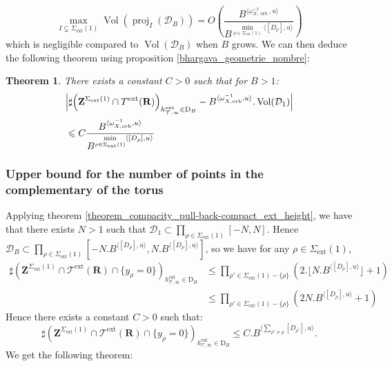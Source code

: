 \documentclass{proc-l}
\newcommand{\R}{\mathbf{R}}
\newcommand{\Z}{\mathbf{Z}}
\DeclareMathOperator{\proj}{proj}
\DeclareMathOperator{\Vol}{Vol}
\DeclareMathOperator{\orb}{orb}
\DeclareMathOperator{\ext}{ext}
\newcommand{\stackT}{\mathcal{T}}
\newcommand{\w}{\omega}
\newtheorem{theorem}{Theorem}[section]
\theoremstyle{definition}
\theoremstyle{remark}
\numberwithin{equation}{section}
\begin{document}
$$\max\limits_{ I \subsetneq \Sigma_{\ext}(1) } \Vol(\proj_I(\mathcal{D}_B)) = O\left( \frac{B^{\langle \w_{X,\orb}^{-1},u\rangle}}{B^{\min\limits_{\rho \in \Sigma_{\ext}(1)} \langle [D_{\rho}],u\rangle} } \right)$$which is negligible compared to $\Vol(\mathcal{D}_B)$ when $B$ grows. We can then deduce the following theorem using proposition \ref{bhargava_geometrie_nombre}:


\begin{theorem}\label{estimation_lattice}
    There exists a constant $C > 0$ such that for $B > 1$:
    \begin{align*}
        &\Big| \sharp \Bigl(  \Z^{\Sigma_{\ext}(1)} \cap T^{\ext}(\R) \Bigr)_{h^{\ext}_{\stackT,\infty} \in \mathrm{D}_{B}}  -   B^{ \langle \w_{X,\orb}^{-1} , u \rangle } . \Vol(\mathcal{D}_1) \Big| \\
        &\leqslant C \frac{B^{\langle \w_{X,\orb}^{-1},u\rangle}}{B^{\min\limits_{\rho \in \Sigma_{\ext}(1)} \langle [D_{\rho}],u\rangle} }
    \end{align*}
\end{theorem}

\subsubsection{Upper bound for the number of points in the complementary of the torus}

Applying theorem \ref{theorem_compacity_pull-back-compact_ext_height}, we have that there exists $N > 1$ such that $\mathcal{D}_1 \subset \prod\limits_{\rho \in \Sigma_{\ext}(1)} [-N,N]$. Hence $\mathcal{D}_B \subset  \prod\limits_{\rho \in \Sigma_{\ext}(1)} \left[ -N.B^{\langle [D_{\rho}] , u \rangle},N.B^{\langle [D_{\rho}] , u \rangle} \right] $, so we have for any $\rho \in \Sigma_{\ext}(1)$,
\begin{align*}
    \sharp\left(\Z^{\Sigma_{\ext}(1)} \cap \stackT^{\ext}(\R) \cap \{y_{\rho} = 0 \} \right)_{h^{\ext}_{\stackT,\infty} \in \mathrm{D}_B} &\leqslant \prod\limits_{\rho' \in \Sigma_{\ext}(1)-\{\rho\}} \left( 2.\lfloor N.B^{\langle [D_{\rho}] , u \rangle} \rfloor + 1 \right) \\
    &\leqslant \prod\limits_{\rho' \in \Sigma_{\ext}(1)-\{\rho\}} \left( 2 N.B^{\langle [D_{\rho}] , u \rangle} + 1 \right)
\end{align*}Hence there exists a constant $C > 0$ such that:
$$\sharp\left(\Z^{\Sigma_{\ext}(1)} \cap \stackT^{\ext}(\R) \cap \{y_{\rho} = 0 \} \right)_{h^{\ext}_{\stackT,\infty} \in \mathrm{D}_B} \leqslant C. B^{\langle \sum\limits_{\rho' \neq \rho} [D_{\rho'}] , u \rangle} .$$We get the following theorem:
\end{document}
